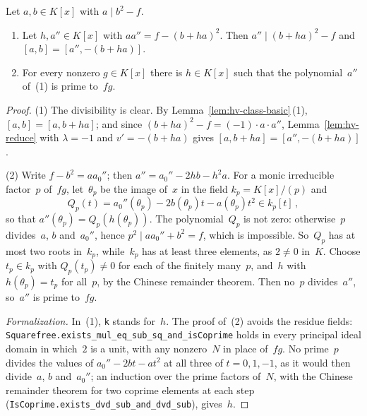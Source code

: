 \begin{lemma}
\label{lem:ds-move}
\leanok
{}
Let $a, b \in K[x]$ with $a \mid b^2 - f$.
\begin{enumerate}
  \item Let $h, a'' \in K[x]$ with $aa'' = f - (b + ha)^2$. Then $a'' \mid (b + ha)^2 - f$ and
    $[a, b] = [a'', -(b + ha)]$.
  \item For every nonzero $g \in K[x]$ there is $h \in K[x]$ such that the polynomial~$a''$
    of~(1) is prime to~$fg$.
\end{enumerate}
\end{lemma}

\begin{proof}
\leanok
{}
(1) The divisibility is clear. By Lemma~\ref{lem:hv-class-basic}\,(1), $[a, b] = [a, b + ha]$;
and since $(b + ha)^2 - f = (-1) \cdot a \cdot a''$, Lemma~\ref{lem:hv-reduce} with
$\lambda = -1$ and $v' = -(b + ha)$ gives $[a, b + ha] = [a'', -(b + ha)]$.

(2) Write $f - b^2 = a a_0''$; then $a'' = a_0'' - 2hb - h^2 a$. For a monic irreducible
factor~$p$ of~$fg$, let~$\theta_p$ be the image of~$x$ in the field $k_p = K[x]/(p)$ and
\[ Q_p(t) = a_0''(\theta_p) - 2b(\theta_p)t - a(\theta_p)t^2 \in k_p[t]\,, \]
so that $a''(\theta_p) = Q_p(h(\theta_p))$. The polynomial~$Q_p$ is not zero: otherwise~$p$
divides~$a$, $b$ and~$a_0''$, hence $p^2 \mid aa_0'' + b^2 = f$, which is impossible. So~$Q_p$ has
at most two roots in~$k_p$, while~$k_p$ has at least three elements, as $2 \ne 0$ in~$K$. Choose
$t_p \in k_p$ with $Q_p(t_p) \ne 0$ for each of the finitely many~$p$, and~$h$ with
$h(\theta_p) = t_p$ for all~$p$, by the Chinese remainder theorem. Then no~$p$ divides~$a''$,
so~$a''$ is prime to~$fg$.

\emph{Formalization.} In~(1), \texttt{k} stands for~$h$. The proof of~(2) avoids the residue
fields: \texttt{Squarefree.exists\_mul\_eq\_sub\_sq\_and\_isCoprime} holds in every principal
ideal domain in which~$2$ is a unit, with any nonzero~$N$ in place of~$fg$. No prime~$p$ divides
the values of $a_0'' - 2bt - at^2$ at all three of $t = 0, 1, -1$, as it would then divide~$a$,
$b$ and~$a_0''$; an induction over the prime factors of~$N$, with the Chinese remainder theorem for
two coprime elements at each step (\texttt{IsCoprime.exists\_dvd\_sub\_and\_dvd\_sub}), gives~$h$.
\end{proof}

